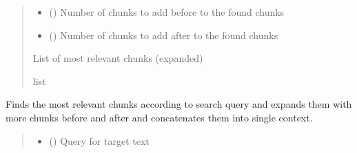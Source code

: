 \documentclass[letterpaper,10pt,english]{sphinxmanual}
\begin{document}
\begin{fulllineitems}
\begin{fulllineitems}
\begin{quote}
\begin{description}
\begin{itemize}
\item {} 
\sphinxAtStartPar
{} () \textendash{} Number of chunks to add before to the found chunks

\item {} 
\sphinxAtStartPar
{} () \textendash{} Number of chunks to add after to the found chunks

\end{itemize}

\sphinxAtStartPar
List of  most relevant chunks (expanded)

\sphinxAtStartPar
list

\end{description}\end{quote}

\end{fulllineitems}


\begin{fulllineitems}
\label{\detokenize{vector_database:vector_database.VectorDatabase.get_prepared_context}}
\pysigstartsignatures
\pysiglinewithargsret
{}
{\sphinxparamcomma {}\sphinxparamcomma {}\sphinxparamcomma {}}
{}
\pysigstopsignatures
\sphinxAtStartPar
Finds the most relevant chunks according to search query and expands them with more chunks before and after and concatenates them into single context.
\begin{quote}\begin{description}
\begin{itemize}
\item {} 
\sphinxAtStartPar
{} () \textendash{} Query for target text


\end{itemize}
\end{description}
\end{quote}
\end{fulllineitems}
\end{fulllineitems}
\end{document}
